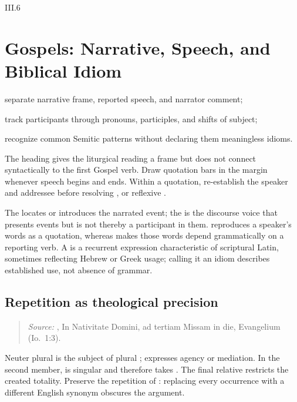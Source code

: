 \begin{courseunit}{III.6}
\chapter{Gospels: Narrative, Speech, and Biblical Idiom}

\begin{learningobjectives}
  \item separate narrative frame, reported speech, and narrator comment;
  \item track participants through pronouns, participles, and shifts of subject;
  \item recognize common Semitic patterns without declaring them meaningless idioms.
\end{learningobjectives}

The heading  gives the liturgical reading a frame but
does not connect syntactically to the first Gospel verb. Draw quotation bars in
the margin whenever speech begins and ends. Within a quotation, re-establish the
speaker and addressee before resolving , or reflexive
.

The  locates or introduces the narrated event; the
 is the discourse voice that presents events but is not thereby
a participant in them.  reproduces a speaker's words as a
quotation, whereas  makes those words depend
grammatically on a reporting verb. A  is a recurrent
expression characteristic of scriptural Latin, sometimes reflecting Hebrew or
Greek usage; calling it an idiom describes established use, not absence of
grammar.

\section{Repetition as theological precision}

\begin{quote}

\emph{Source:} \Missal, In Nativitate Domini, ad tertiam Missam in die,
Evangelium (Io.~1:3).
\end{quote}

Neuter plural  is the subject of plural ;
 expresses agency or mediation. In the second member,
 is singular and therefore takes . The final
relative  restricts the created totality. Preserve the
repetition of : replacing every occurrence with a different
English synonym obscures the argument.


\end{courseunit}
